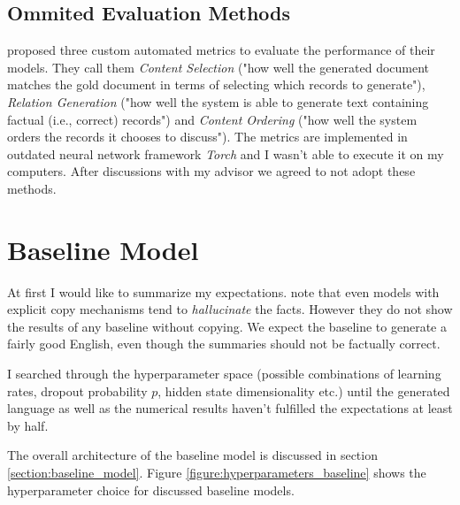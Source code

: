 \subsection{Ommited Evaluation Methods}

\citep{wiseman2017} proposed three custom automated metrics to evaluate the performance of their models. They call them \emph{Content Selection} ("how well the generated document matches the gold document in terms of selecting which records to generate"), \emph{Relation Generation} ("how well the system is able to generate text containing factual (i.e., correct) records") and \emph{Content Ordering} ("how well the system orders the records it chooses to discuss"). The metrics are implemented in outdated neural network framework \emph{Torch} and I wasn't able to execute it on my computers. After discussions with my advisor we agreed to not adopt these methods.

\section{Baseline Model}

At first I would like to summarize my expectations. \citep{wiseman2017} note that even models with explicit copy mechanisms tend to \emph{hallucinate} the facts. However they do not show the results of any baseline without copying. We expect the baseline to generate a fairly good English, even though the summaries should not be factually correct.

I searched through the hyperparameter space (possible combinations of learning rates, dropout probability $p$, hidden state dimensionality etc.) until the generated language as well as the numerical results haven't fulfilled the expectations at least by half.

The overall architecture of the baseline model is discussed in section \ref{section:baseline_model}. Figure \ref{figure:hyperparameters_baseline} shows the hyperparameter choice for discussed baseline models.

